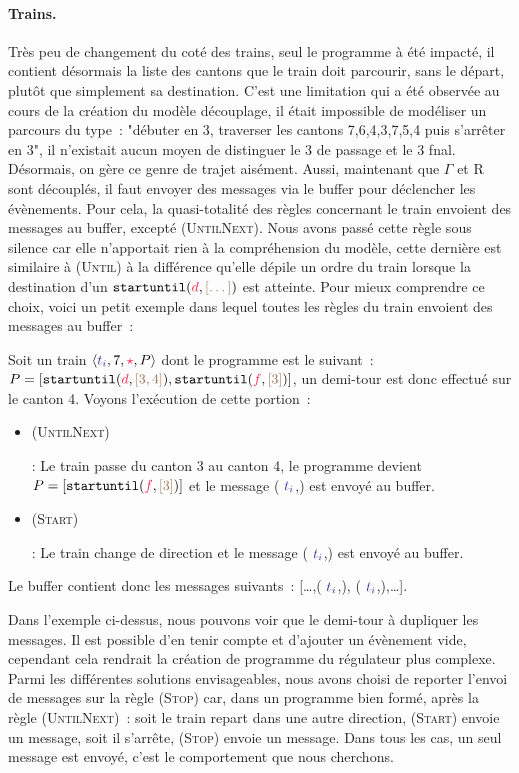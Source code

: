 \documentclass[oneside, a4paper, 11pt]{book}
\newcommand{\ruleFmt}[1]{\textsc{(#1)}}
\newcommand{\ruleDef}[1]{\hypertarget{#1}{\ruleFmt{#1}}}
\newcommand{\trainFmt}[1]{{\color{traincolor} #1}}
\newcommand{\tid}[1]{\ensuremath{\trainFmt{t_{#1}}}}
\newcommand{\dirFmt}[1]{{\color{dircolor} #1}}
\newcommand{\posFmt}[1]{{\color{poscolor}{#1}}}
\newcommand{\su}[2]{{\mbox{$\mathtt{startuntil}(\dirFmt{#1}, \posFmt{#2})$}}}
\newcommand\train[4]{ \langle #1, #2, #3, #4 \rangle}
\begin{document}
\paragraph{Trains.} Très peu de changement du coté des trains, seul le programme à été impacté, il contient désormais la liste des cantons que le train doit parcourir, sans le départ, plutôt que simplement sa destination.
C'est une limitation qui a été observée au cours de la création du modèle découplage, il était impossible de modéliser un parcours du type~: "débuter en 3, traverser les cantons 7,6,4,3,7,5,4 puis s'arrêter en 3", il n'existait aucun moyen de distinguer le 3 de passage et le 3 fnal.
Désormais, on gère ce genre de trajet aisément. Aussi, maintenant que \trainFmt{$\Gamma$} et R sont découplés, il faut envoyer des messages via le buffer pour déclencher les évènements. Pour cela, la quasi-totalité des règles concernant le train envoient des messages au buffer, excepté \ruleDef{UntilNext}.
Nous avons passé cette règle sous silence car elle n'apportait rien à la compréhension du modèle, cette dernière est similaire à \ruleDef{Until} à la différence qu'elle dépile un ordre du train lorsque la destination d'un \su{d}{[\dots]} est atteinte. Pour mieux comprendre ce choix, voici un petit exemple dans lequel toutes les règles du train envoient des messages au buffer~:


\begin{example}
	Soit un train $\train{\tid{i}}{7}{\dirFmt{\star}}{P}$ dont le programme est le suivant~: $P = [\su{d}{[3,4]}, \su{f}{[3]}]$, un demi-tour est donc effectué sur le canton 4. 
	Voyons l'exécution de cette portion~:
	\begin{itemize}
		\item \ruleDef{UntilNext} : Le train passe du canton 3 au canton 4, le programme devient $P = [\su{f}{[3]}]$ et le message (\trainFmt{$\tid{i}$},\posFmt{4}) est envoyé au buffer.
		\item \ruleDef{Start} : Le train change de direction et le message (\trainFmt{$\tid{i}$},\posFmt{4}) est envoyé au buffer.
	\end{itemize}
	Le buffer contient donc les messages suivants~: [\dots,(\trainFmt{$\tid{i}$},\posFmt{4}), (\trainFmt{$\tid{i}$},\posFmt{4}),\dots].
\end{example}

\noindent
Dans l'exemple ci-dessus, nous pouvons voir que le demi-tour à dupliquer les messages. Il est possible d'en tenir compte et d'ajouter un évènement vide, cependant cela rendrait la création de programme du régulateur plus complexe.
Parmi les différentes solutions envisageables, nous avons choisi de reporter l'envoi de messages sur la règle \ruleDef{Stop} car, dans un programme bien formé, après la règle \ruleDef{UntilNext}~: soit le train repart dans une autre direction, \ruleDef{Start} envoie un message, soit il s'arrête, \ruleDef{Stop} envoie un message.
Dans tous les cas, un seul message est envoyé, c'est le comportement que nous cherchons.
\end{document}
